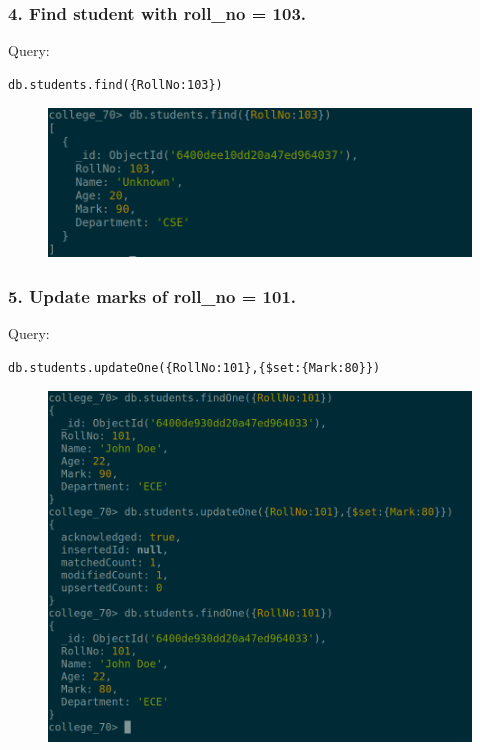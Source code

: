 \documentclass{article}
\begin{document}
\subsubsection*{4. Find student with roll\_no = 103.}
Query:
\begin{Verbatim}[frame=single,framerule=1pt,fontfamily=courier,fontsize=\small]
db.students.find({RollNo:103})
\end{Verbatim}
\begin{figure}[H]
    \centering
    \includegraphics[width=\textwidth]{cycle7/7.4.png}
\end{figure}

\subsubsection*{5. Update marks of roll\_no = 101.}
Query:
\begin{Verbatim}[frame=single,framerule=1pt,fontfamily=courier,fontsize=\small]
db.students.updateOne({RollNo:101},{$set:{Mark:80}})
\end{Verbatim}
\begin{figure}[H]
    \centering
    \includegraphics[width=\textwidth]{cycle7/7.5.png}
\end{figure}
\end{document}
